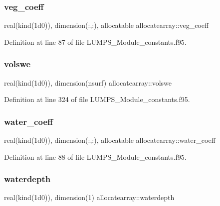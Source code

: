 \subsubsection{\texorpdfstring{veg\+\_\+coeff}{veg\_coeff}}
{\footnotesize\ttfamily real(kind(1d0)), dimension(\+:,\+:), allocatable allocatearray\+::veg\+\_\+coeff}



Definition at line 87 of file L\+U\+M\+P\+S\+\_\+\+Module\+\_\+constants.\+f95.

\mbox{\label{namespaceallocatearray_a69a92d219248dd5badf19a6cbcdfb372}} 
\subsubsection{\texorpdfstring{volswe}{volswe}}
{\footnotesize\ttfamily real(kind(1d0)), dimension(nsurf) allocatearray\+::volswe}



Definition at line 324 of file L\+U\+M\+P\+S\+\_\+\+Module\+\_\+constants.\+f95.

\mbox{\label{namespaceallocatearray_ad52819ac6636f70c1067c6d2e645e542}} 
\subsubsection{\texorpdfstring{water\+\_\+coeff}{water\_coeff}}
{\footnotesize\ttfamily real(kind(1d0)), dimension(\+:,\+:), allocatable allocatearray\+::water\+\_\+coeff}



Definition at line 88 of file L\+U\+M\+P\+S\+\_\+\+Module\+\_\+constants.\+f95.

\mbox{\label{namespaceallocatearray_a1b3be466e275395a0ce613feb29c678d}} 
\subsubsection{\texorpdfstring{waterdepth}{waterdepth}}
{\footnotesize\ttfamily real(kind(1d0)), dimension(1) allocatearray\+::waterdepth}



